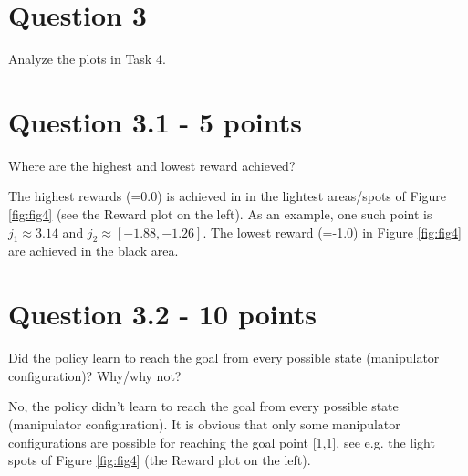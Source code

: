 \documentclass[12pt]{article}
\begin{document}
\section*{Question 3}

Analyze the plots in Task 4.


\section*{Question 3.1 - 5 points}

Where are the highest and lowest reward achieved?
\newline

\noindent
The highest rewards (=0.0) is achieved in in the lightest areas/spots of Figure \ref*{fig:fig4} (see the Reward plot on the left). As an example, one such point is $j_1 \approx 3.14$ and $j_2 \approx [-1.88,-1.26]$. The lowest reward (=-1.0) in Figure \ref*{fig:fig4} are achieved in the black area.



\section*{Question 3.2 - 10 points}

Did the policy learn to reach the goal from every possible state (manipulator
configuration)? Why/why not?
\newline

\noindent
No, the policy didn't learn to reach the goal from every possible state (manipulator configuration). It is obvious that only some manipulator configurations are possible for reaching the goal point [1,1], see e.g. the light spots of Figure \ref*{fig:fig4} (the Reward plot on the left).


\pagebreak



\end{document}
